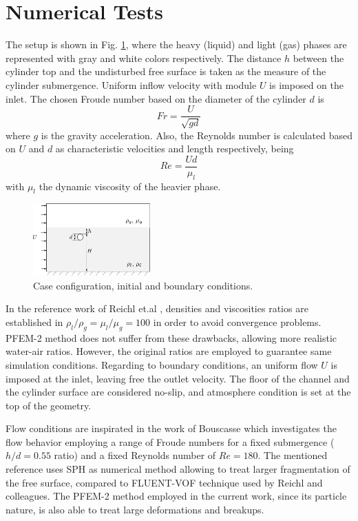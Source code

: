 \section{Numerical Tests}

The setup is shown in Fig. \ref{fg:config}, where the heavy (liquid) and light (gas) phases are represented with gray and white colors respectively. The distance $h$ between the cylinder top and the undisturbed free surface is taken as the measure of the cylinder submergence. Uniform inflow velocity with module $U$ is imposed on the inlet. The chosen Froude number based on the diameter of the cylinder $d$ is
\begin{equation}
 Fr = \frac{U}{\sqrt{gd}}
\label{eq:froude}
\end{equation}
where $g$ is the gravity acceleration. Also, the Reynolds number is calculated based on $U$ and $d$ as characteristic velocities and length respectively, being
\begin{equation}
 Re = \frac{U d}{\mu_l}
\label{eq:reynolds}
\end{equation}
with $\mu_l$ the dynamic viscosity of the heavier phase.

\begin{figure}[ht]
  \centering
  \includegraphics[width=0.4\textwidth]{images_10thspheric/config.pdf}
  \caption{Case configuration, initial and boundary conditions.}
  \label{fg:config}
\end{figure}

In the reference work of Reichl et.al \cite{Reichl05}, densities and viscosities ratios are established in $\rho_l/\rho_g = \mu_l/\mu_g=100$ in order to avoid convergence problems. PFEM-2 method does not suffer from these drawbacks, allowing more realistic water-air ratios. However, the original ratios are employed to guarantee same simulation conditions. Regarding to boundary conditions, an uniform flow $U$ is imposed at the inlet, leaving free the outlet velocity. The floor of the channel and the cylinder surface are considered no-slip, and atmosphere condition is set at the top of the geometry.

Flow conditions are inspirated in the work of Bouscasse \cite{Bouscasse14} which investigates the flow behavior employing a range of Froude numbers for a fixed submergence ($h/d=0.55$ ratio) and a fixed Reynolds number of $Re=180$. The mentioned reference uses SPH as numerical method allowing to treat larger fragmentation of the free surface, compared to FLUENT-VOF technique used by Reichl and colleagues. The PFEM-2 method employed in the current work, since its particle nature, is also able to treat large deformations and breakups.

